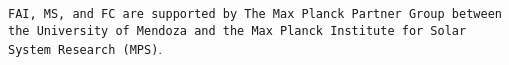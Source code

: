 \documentclass[baaa]{baaa}
\begin{document}
\begin{acknowledgement}
\texttt{FAI, MS, and FC are supported by The Max Planck Partner Group between the University of Mendoza and the Max Planck Institute for Solar System Research (MPS)}.
\end{acknowledgement}






\end{document}
